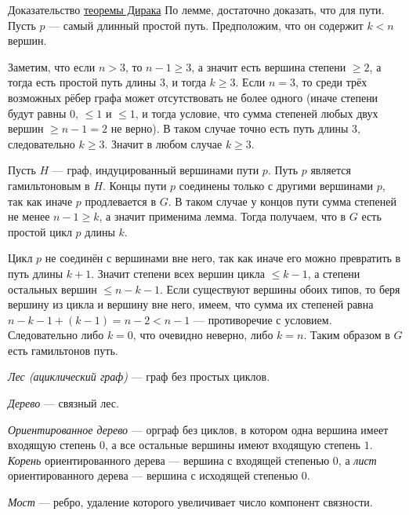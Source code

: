 \documentclass[12pt,a4paper]{article}
\begin{document}
    \begin{varproof}{Доказательство \hyperref[Dirac's-theorem]{теоремы Дирака}}
        По лемме, достаточно доказать, что для пути. Пусть $p$ --- самый длинный простой путь. Предположим, что он содержит $k < n$ вершин.

        Заметим, что если $n > 3$, то $n - 1 \geqslant 3$, а значит есть вершина степени $\geqslant 2$, а тогда есть простой путь длины $3$, и тогда $k \geqslant 3$. Если $n = 3$, то среди трёх возможных рёбер графа может отсутствовать не более одного (иначе степени будут равны $0$, $\leqslant 1$ и $\leqslant 1$, и тогда условие, что сумма степеней любых двух вершин $\geqslant n - 1 = 2$ не верно). В таком случае точно есть путь длины $3$, следовательно $k \geqslant 3$. Значит в любом случае $k \geqslant 3$.

        Пусть $H$ --- граф, индуцированный вершинами пути $p$. Путь $p$ является гамильтоновым в $H$. Концы пути $p$ соединены только с другими вершинами $p$, так как иначе $p$ продлевается в $G$. В таком случае у концов пути сумма степеней не менее $n - 1 \geqslant k$, а значит применима лемма. Тогда получаем, что в $G$ есть простой цикл $p$ длины $k$.
        
        Цикл $p$ не соединён с вершинами вне него, так как иначе его можно превратить в путь длины $k + 1$. Значит степени всех вершин цикла $\leqslant k - 1$, а степени остальных вершин $\leqslant n - k - 1$. Если существуют вершины обоих типов, то беря вершину из цикла и вершину вне него, имеем, что сумма их степеней равна $n - k - 1 + (k - 1)= n - 2 < n - 1$ --- противоречие с условием. Следовательно либо $k = 0$, что очевидно неверно, либо $k = n$. Таким образом в $G$ есть гамильтонов путь.
    \end{varproof}

    \begin{definition}
        \emph{Лес (ациклический граф)} --- граф без простых циклов.

        \emph{Дерево} --- связный лес.

        \emph{Ориентированное дерево} --- орграф без циклов, в котором одна вершина имеет входящую степень $0$, а все остальные вершины имеют входящую степень $1$. \emph{Корень} ориентированного дерева --- вершина с входящей степенью $0$, а \emph{лист} ориентированного дерева --- вершина с исходящей степенью $0$.
    \end{definition}

    \begin{definition}
        \emph{Мост} --- ребро, удаление которого увеличивает число компонент связности.
    \end{definition}
\end{document}
